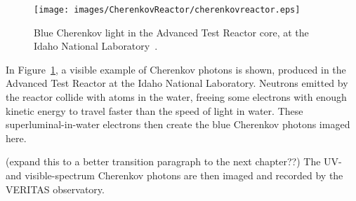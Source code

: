   \begin{figure}[ht]
    \centering
    \texttt{[image: images/CherenkovReactor/cherenkovreactor.eps]}
    \caption[Chernekov Light from a Reactor]{
      Blue Cherenkov light in the Advanced Test Reactor core, at the Idaho National Laboratory~\cite{cherenkovreactor,atrlab}.
    }
    \label{fig:cherenkovreactor}
  \end{figure}
  
  In Figure~\ref{fig:cherenkovreactor}, a visible example of Cherenkov photons is shown, produced in the Advanced Test Reactor at the Idaho National Laboratory.
  Neutrons emitted by the reactor collide with atoms in the water, freeing some electrons with enough kinetic energy to travel faster than the speed of light in water.
  These superluminal-in-water electrons then create the blue Cherenkov photons imaged here.
  
  {\color{red}(expand this to a better transition paragraph to the next chapter??)}
  The UV- and visible-spectrum Cherenkov photons are then imaged and recorded by the VERITAS observatory.
  

